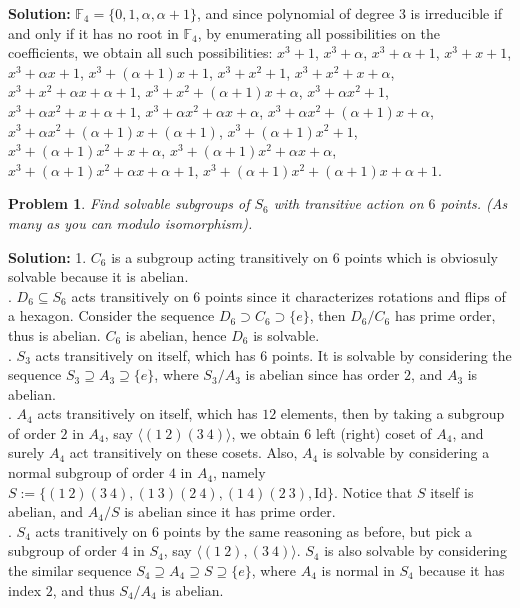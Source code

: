 \documentclass[12pt]{article}
\newtheorem{problem}{Problem}
\begin{document}
\textbf{Solution:} $\mathbb{F}_4=\{0, 1, \alpha, \alpha+1\}$, and since polynomial of degree $3$ is irreducible if and only if it has no root in $\mathbb{F}_4$, by enumerating all possibilities on the coefficients, we obtain all such possibilities: $x^3+1$, $x^3+\alpha$, $x^3+\alpha+1$, $x^3+x+1$, $x^3+\alpha x+1$, $x^3+(\alpha+1)x+1$, $x^3+x^2+1$, $x^3+x^2+x+\alpha$, $x^3+x^2+\alpha x+\alpha+1$, $x^3+x^2+(\alpha+1)x+\alpha$, $x^3+\alpha x^2+1$, $x^3+\alpha x^2+x+\alpha+1$, $x^3+\alpha x^2+\alpha x+\alpha$, $x^3+\alpha x^2+(\alpha+1)x+\alpha$, $x^3+\alpha x^2+(\alpha+1)x+(\alpha+1)$, $x^3+(\alpha+1)x^2+1$, $x^3+(\alpha+1)x^2+x+\alpha$, $x^3+(\alpha+1)x^2+\alpha x+\alpha$, $x^3+(\alpha+1)x^2+\alpha x+\alpha+1$, $x^3+(\alpha+1)x^2+(\alpha+1)x+\alpha+1$.
\\
\begin{problem}
Find solvable subgroups of $S_6$ with transitive action on $6$ points. (As many as you can modulo isomorphism).
\end{problem}

\textbf{Solution:} 1. $C_{6}$ is a subgroup acting transitively on $6$ points which is obviosuly solvable because it is abelian.\\
. $D_6\subseteq S_6$ acts transitively on $6$ points since it characterizes rotations and flips of a hexagon. Consider the sequence $D_6\supset C_6\supset \{e\}$, then $D_6/C_{6}$ has prime order, thus is abelian. $C_6$ is abelian, hence $D_6$ is solvable. \\
. $S_{3}$ acts transitively on itself, which has $6$ points. It is solvable by considering the sequence $S_{3}\supseteq A_3\supseteq \{e\}$, where $S_3/A_3$ is abelian since has order $2$, and $A_3$ is abelian. \\
. $A_4$ acts transitively on itself, which has $12$ elements, then by taking a subgroup of order $2$ in $A_4$, say $\langle (1\ 2)(3\ 4)\rangle$, we obtain $6$ left (right) coset of $A_4$, and surely $A_4$ act transitively on these cosets. Also, $A_4$ is solvable by considering a normal subgroup of order $4$ in $A_4$, namely $S:=\{(1\ 2)(3\ 4), (1\ 3)(2\ 4), (1\ 4)(2\ 3), \text{Id}\}$. Notice that $S$ itself is abelian, and $A_4/S$ is abelian since it has prime order.\\
. $S_4$ acts tranitively on 6 points by the same reasoning as before, but pick a subgroup of order $4$ in $S_4$, say $\langle (1\ 2), (3\ 4)\rangle$. $S_4$ is also solvable by considering the similar sequence $S_4\supseteq A_4\supseteq S\supseteq\{e\}$, where $A_{4}$ is normal in $S_{4}$ because it has index $2$, and thus $S_{4}/A_{4}$ is abelian. \\
\end{document}
